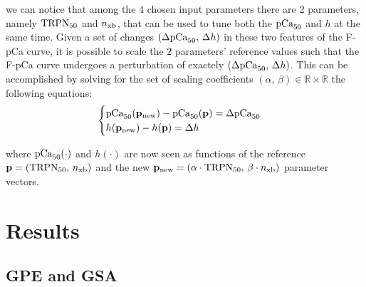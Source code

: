 \noindent
we can notice that among the $4$ chosen input parameters there are $2$ parameters, namely $\textrm{TRPN}_{50}$ and $n_{\textrm{xb}}$, that can be used to tune both the $\textrm{pCa}_{50}$ and $h$ at the same time. Given a set of changes $(\Delta\textrm{pCa}_{50},\,\Delta h)$ in these two features of the F-pCa curve, it is possible to scale the $2$ parameters' reference values such that the F-pCa curve undergoes a perturbation of exactely $(\Delta\textrm{pCa}_{50},\,\Delta h)$. This can be accomplished by solving for the set of scaling coefficients $(\alpha,\,\beta)\in\mathbb{R}\times\mathbb{R}$ the following equations:
%
\begin{equation}
    \begin{cases}
        \textrm{pCa}_{50}(\mathbf{p}_{\textrm{new}}) - \textrm{pCa}_{50}(\mathbf{p}) = \Delta\textrm{pCa}_{50} \\
        h(\mathbf{p}_{\textrm{new}}) - h(\mathbf{p}) = \Delta h
    \end{cases}
\end{equation}

\noindent
where $\textrm{pCa}_{50}(\cdot)$ and $h(\cdot)$ are now seen as functions of the reference $\mathbf{p}=(\textrm{TRPN}_{50},\,n_{\textrm{xb}})$ and the new $\mathbf{p}_{\textrm{new}}=(\alpha\cdot\textrm{TRPN}_{50},\,\beta\cdot n_{\textrm{xb}})$ parameter vectors.




%
%
%
\section{Results}\label{sec:ch5results}

\subsection{GPE and GSA}


